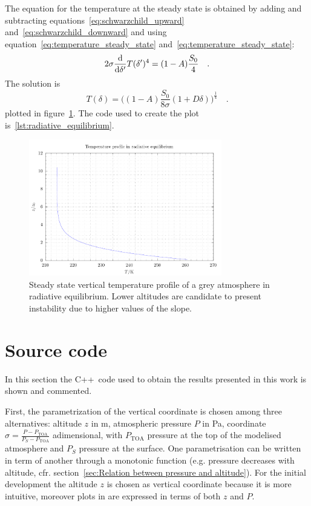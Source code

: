 \documentclass[a4paper,10pt,twocolumn,\classoptions]{article}
\newcommand{\cpp}{C++}
\newcommand{\PTOA}{P_\text{TOA}}
\begin{document}
The equation for the temperature at the steady state is obtained by adding and subtracting equations~\eqref{eq:schwarzchild_upward} and~\eqref{eq:schwarzchild_downward} and using equation~\eqref{eq:temperature_steady_state} and~\eqref{eq:temperature_steady_state}:
\begin{equation}
  \label{eq:temperature_radiative_equilibrium}
  2 \sigma \odv*{T(\delta')^4}{\delta'} = (1 - A) \frac{S_0}{4}
  \quad .
\end{equation}
The solution is
\begin{equation}
  \label{eq:temperature_radiative_equilibrium_solution}
  T(\delta) = \bigg( (1 - A) \frac{S_0}{8 \sigma} (1 + D \delta) \bigg)^\frac{1}{4}
  \quad .
\end{equation}
plotted in figure~\ref{fig:temperature_radiative_equilibrium}. The code used to create the plot is~\ref{lst:radiative_equilibrium}.
\begin{figure}[h]
  \centering
  \includegraphics*[keepaspectratio=true,width=0.75\textwidth]{temperature_radiative_equilibrium}
  \caption{Steady state vertical temperature profile of a grey atmosphere in radiative equilibrium. Lower altitudes are candidate to present instability due to higher values of the slope.}
  \label{fig:temperature_radiative_equilibrium}
\end{figure}



\newpage
\appendix

\onecolumn
\section{Source code}
In this section the \cpp\ code used to obtain the results presented in this work is shown and commented.

First, the parametrization of the vertical coordinate is chosen among three alternatives: altitude $z$ in \unit{\metre}, atmospheric pressure $P$ in \unit{\pascal}, coordinate $\sigma = \frac{P - \PTOA}{P_S - \PTOA}$ adimensional, with $\PTOA$ pressure at the top of the modelised atmosphere and $P_S$ pressure at the surface. One parametrisation can be written in term of another through a monotonic function (e.g. pressure decreases with altitude, cfr. section~\ref{sec:Relation between pressure and altitude}). For the initial development the altitude $z$ is chosen as vertical coordinate because it is more intuitive, moreover plots in \cite{TTAPS-I} are expressed in terms of both $z$ and $P$.
\end{document}
